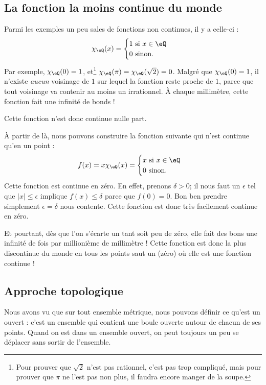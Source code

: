 \subsection{La fonction la moins continue du monde}

Parmi les exemples un peu sales de fonctions non continues, il y a celle-ci :
\[
  \chi_{\eQ}(x)=
\begin{cases}
    1 \text{ si }x\in\eQ\\
    0 \text{ sinon.}
\end{cases}
\]
Par exemple, $\chi_{\eQ}(0)=1$, et\footnote{Pour prouver que $\sqrt{2}$ n'est pas rationnel, c'est pas trop compliqué, mais pour prouver que $\pi$ ne l'est pas non plus, il faudra encore manger de la soupe.} $\chi_{\eQ}(\pi)=\chi_{\eQ}(\sqrt{2})=0$. Malgré que $\chi_{\eQ}(0)=1$, il n'existe \emph{aucun} voisinage de $1$ sur lequel la fonction reste proche de $1$, parce que tout voisinage va contenir au moins un irrationnel. À chaque millimètre, cette fonction fait une infinité de bonds !

Cette fonction n'est donc continue nulle part.

À partir de là, nous pouvons construire la fonction suivante qui n'est continue qu'en un point :
\[
  f(x)=x\chi_{\eQ}(x)=
\begin{cases}
x\text{ si }x\in\eQ\\
0\text{ sinon.}
\end{cases}
\]
Cette fonction est continue en zéro. En effet, prenons $\delta>0$; il nous faut un $\epsilon$ tel que $| x |\leq\epsilon$ implique $f(x)\leq \delta$ parce que $f(0)=0$. Bon ben prendre simplement $\epsilon=\delta$ nous contente. Cette fonction est donc très facilement continue en zéro.

Et pourtant, dès que l'on s'écarte un tant soit peu de zéro, elle fait des bons une infinité de fois par millionième de millimètre ! Cette fonction est donc la plus discontinue du monde en tous les points saut un (zéro) où elle est une fonction continue !

\subsection{Approche topologique}

Nous avons vu que sur tout ensemble métrique, nous pouvons définir ce qu'est un ouvert : c'est un ensemble qui contient une boule ouverte autour de chacun de ses points. Quand on est dans un ensemble ouvert, on peut toujours un peu se déplacer sans sortir de l'ensemble.

